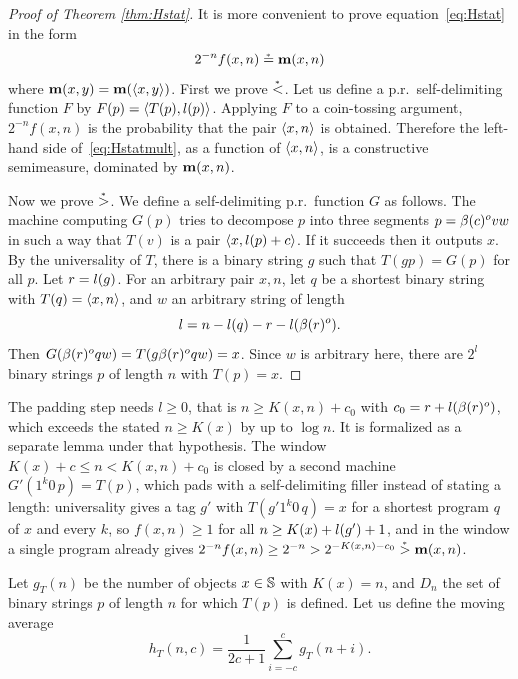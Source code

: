 \begin{proof}[Proof of Theorem \protect\ref{thm:Hstat}]
  \leanok
 It is more convenient to prove equation~\eqref{eq:Hstat}
in the form 
 \setcounter{equation}{2}%
 \begin{equation} \label{eq:Hstatmult} 
 	2^{-n}f(x,n) \stackrel{{}_*}{=} \mathbf{m}(x,n)
 \end{equation}
 where $\mathbf{m}(x,y) = \mathbf{m}({\mathopen\langle  x,y\mathclose\rangle} )$.
First we prove $\stackrel{{}_*}{<}$.
Let us define a p.r.~self-delimiting function $F$ by
 $F(p) = \mathopen\langle T(p), l(p)\mathclose\rangle$.
Applying $F$ to a coin-tossing argument, $2^{-n}f(x,n)$ is the
probability that the pair ${\mathopen\langle x, n\mathclose\rangle} $ is obtained.
Therefore the left-hand side of~\eqref{eq:Hstatmult}, as a function of
${\mathopen\langle  x,n\mathclose\rangle}$, is a constructive semimeasure, dominated by $\mathbf{m}(x,n)$.

  Now we prove $\stackrel{{}_*}{>}$.
  We define a self-delimiting p.r.~function $G$ as follows.
  The machine computing $G(p)$ tries to decompose $p$ into
three segments $p=\beta(c)^o v w$ in such a way that $T(v)$ is a pair 
${\mathopen\langle  x, l(p) + c \mathclose\rangle}$.
  If it succeeds then it outputs $x$.
  By the universality of $T$, there is a binary string $g$ such that
$T(gp)=G(p)$ for all $p$.
  Let $r=l(g)$.
 For an arbitrary pair $x,n$, let $q$ be a shortest binary string with
$T(q) = \mathopen\langle  x,n\mathclose\rangle$, and $w$ an arbitrary string of length
 \[
 	l = n - l(q) - r - l(\beta(r)^o).
 \]
  Then $G(\beta(r)^o q w) = T(g \beta(r)^o q w) = x$.
  Since $w$ is arbitrary here, there are $2^l$ binary strings $p$ of length
$n$ with $T(p) = x$.
 \end{proof}

\begin{formalization}
The padding step needs $l \ge 0$, that is $n \ge K(x,n) + c_0$ with $c_0 = r + l(\beta(r)^o)$, which exceeds the stated $n \ge K(x)$ by up to $\log n$. It is formalized as a separate lemma under that hypothesis. The window $K(x) + c \le n < K(x,n) + c_0$ is closed by a second machine $G'(1^k 0\, p) = T(p)$, which pads with a self-delimiting filler instead of stating a length: universality gives a tag $g'$ with $T(g' 1^k 0\, q) = x$ for a shortest program $q$ of $x$ and every $k$, so $f(x,n) \ge 1$ for all $n \ge K(x) + l(g') + 1$, and in the window a single program already gives $2^{-n} f(x,n) \ge 2^{-n} > 2^{-K(x,n) - c_0} \stackrel{{}_*}{>} \mathbf{m}(x,n)$.
\end{formalization}

 \begin{definition}
  \label{def:Dn}
  \leanok
  Let $g_{T}(n)$ be the number of objects $x \in \mathbb{S}$ with $K(x)=n$, and $D_{n}$
the set of binary strings $p$ of length $n$ for which $T(p)$ is
defined.
  Let us define the moving average
 \[
	h_{T}(n,c) = \frac{1}{2c+1}\sum_{i = -c}^c g_{T}(n+i).
 \]
 \end{definition}

